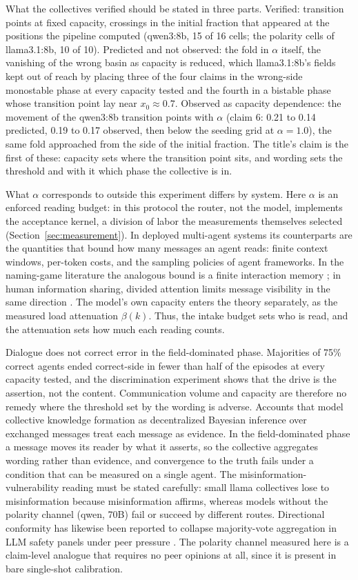 \documentclass[11pt]{article}
\begin{document}
What the collectives verified should be stated in three parts. Verified:
transition points at fixed capacity, crossings in the initial fraction that
appeared at the positions the pipeline computed (qwen3:8b, 15 of 16 cells;
the polarity cells of llama3.1:8b, 10 of 10). Predicted and not observed:
the fold in $\alpha$ itself, the vanishing of the wrong basin as capacity
is reduced, which llama3.1:8b's fields kept out of reach by placing three
of the four claims in the wrong-side monostable phase at every capacity
tested and the fourth in a bistable phase whose transition point lay near
$x_0 \approx 0.7$. Observed as capacity dependence: the movement of the
qwen3:8b transition points with $\alpha$ (claim 6: 0.21 to 0.14 predicted,
0.19 to 0.17 observed, then below the seeding grid at $\alpha = 1.0$), the
same fold approached from the side of the initial fraction. The title's
claim is the first of these: capacity sets where the transition point sits,
and wording sets the threshold and with it which phase the collective is
in.

What $\alpha$ corresponds to outside this experiment differs by system.
Here $\alpha$ is an enforced reading budget: in this protocol the router,
not the model, implements the acceptance kernel, a division of labor the
measurements themselves selected (Section~\ref{sec:measurement}). In
deployed multi-agent systems its counterparts are the quantities that bound
how many messages an agent reads: finite context windows, per-token costs,
and the sampling policies of agent frameworks. In the naming-game
literature the analogous bound is a finite interaction memory
\citep{Flint2026}; in human information sharing, divided attention limits
message visibility in the same direction \citep{HodasLerman2012}. The
model's own capacity enters the theory separately, as the measured load
attenuation $\beta(k)$. Thus, the intake budget sets who is read, and the
attenuation sets how much each reading counts.

Dialogue does not correct error in the field-dominated phase. Majorities of
75\% correct agents ended correct-side in fewer than half of the episodes
at every capacity tested, and the discrimination experiment shows that the
drive is the assertion, not the content. Communication volume and capacity
are therefore no remedy where the threshold set by the wording is adverse.
Accounts that model collective knowledge formation as decentralized
Bayesian inference over exchanged messages \citep{Taniguchi2024} treat
each message as evidence. In the field-dominated phase a message moves its
reader by what it asserts, so the collective aggregates wording rather than
evidence, and convergence to the truth fails under a condition that can be
measured on a single agent. The misinformation-vulnerability reading must
be
stated carefully: small llama collectives lose to misinformation because
misinformation affirms, whereas models without the polarity channel (qwen,
70B) fail or succeed by different routes. Directional conformity has
likewise been reported to collapse majority-vote aggregation in LLM safety
panels under peer pressure \citep{HuQu2026}. The polarity channel measured
here is a claim-level analogue that requires no peer opinions at all, since
it is present in bare single-shot calibration.
\end{document}
